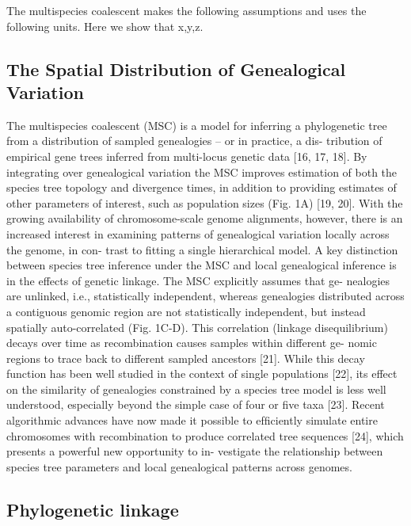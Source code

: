 \documentclass[12pt]{article}
\begin{document}
\newpage

\noindent 
The multispecies coalescent makes the following assumptions and uses
the following units. Here we show that x,y,z.

\subsection*{The Spatial Distribution of Genealogical Variation}

The multispecies coalescent (MSC) is a model for inferring a phylogenetic tree from a distribution of sampled genealogies – or in practice, a dis-
tribution of empirical gene trees inferred from multi-locus genetic data [16, 17, 18]. By integrating over
genealogical variation the MSC improves estimation of both the species tree topology and divergence
times, in addition to providing estimates of other parameters of interest, such as population sizes (Fig.
1A) [19, 20]. With the growing availability of chromosome-scale genome alignments, however, there is
an increased interest in examining patterns of genealogical variation locally across the genome, in con-
trast to ﬁtting a single hierarchical model. A key distinction between species tree inference under the MSC
and local genealogical inference is in the effects of genetic linkage. The MSC explicitly assumes that ge-
nealogies are unlinked, i.e., statistically independent, whereas genealogies distributed across a contiguous
genomic region are not statistically independent, but instead spatially auto-correlated (Fig. 1C-D). This
correlation (linkage disequilibrium) decays over time as recombination causes samples within different ge-
nomic regions to trace back to different sampled ancestors [21]. While this decay function has been well
studied in the context of single populations [22], its effect on the similarity of genealogies constrained by
a species tree model is less well understood, especially beyond the simple case of four or ﬁve taxa [23].
Recent algorithmic advances have now made it possible to efﬁciently simulate entire chromosomes with
recombination to produce correlated tree sequences [24], which presents a powerful new opportunity to in-
vestigate the relationship between species tree parameters and local genealogical patterns across genomes.

\subsection*{Phylogenetic linkage}
\end{document}
